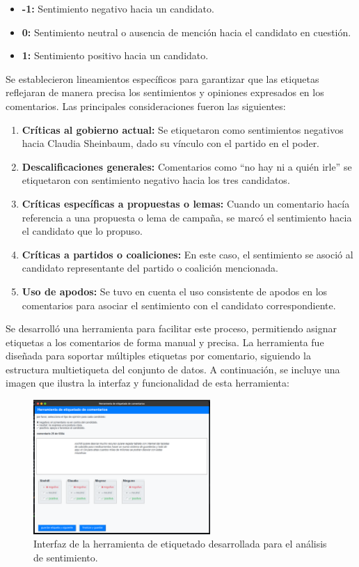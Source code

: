 \documentclass[10pt, a4paper]{article}
\begin{document}
	\begin{itemize}
		\item \textbf{-1:} Sentimiento negativo hacia un candidato.
		\item \textbf{0:} Sentimiento neutral o ausencia de mención hacia el candidato en cuestión.
		\item \textbf{1:} Sentimiento positivo hacia un candidato.
	\end{itemize}
	
	Se establecieron lineamientos específicos para garantizar que las etiquetas reflejaran de manera precisa los sentimientos y opiniones expresados en los comentarios. Las principales consideraciones fueron las siguientes:
	
	\begin{enumerate}
		\item \textbf{Críticas al gobierno actual:} Se etiquetaron como sentimientos negativos hacia Claudia Sheinbaum, dado su vínculo con el partido en el poder.
		\item \textbf{Descalificaciones generales:} Comentarios como ``no hay ni a quién irle'' se etiquetaron con sentimiento negativo hacia los tres candidatos.
		\item \textbf{Críticas específicas a propuestas o lemas:} Cuando un comentario hacía referencia a una propuesta o lema de campaña, se marcó el sentimiento hacia el candidato que lo propuso.
		\item \textbf{Críticas a partidos o coaliciones:} En este caso, el sentimiento se asoció al candidato representante del partido o coalición mencionada.
		\item \textbf{Uso de apodos:} Se tuvo en cuenta el uso consistente de apodos en los comentarios para asociar el sentimiento con el candidato correspondiente.
	\end{enumerate}
	
	
	Se desarrolló una herramienta para facilitar este proceso, permitiendo asignar etiquetas a los comentarios de forma manual y precisa. La herramienta fue diseñada para soportar múltiples etiquetas por comentario, siguiendo la estructura multietiqueta del conjunto de datos. A continuación, se incluye una imagen que ilustra la interfaz y funcionalidad de esta herramienta:
	
	\begin{figure}[H]
		\centering
		\includegraphics[width=0.6\textwidth]{etiquetado.png}
		\caption{Interfaz de la herramienta de etiquetado desarrollada para el análisis de sentimiento.}
		\label{fig:etiquetado}
	\end{figure}
	
\end{document}

